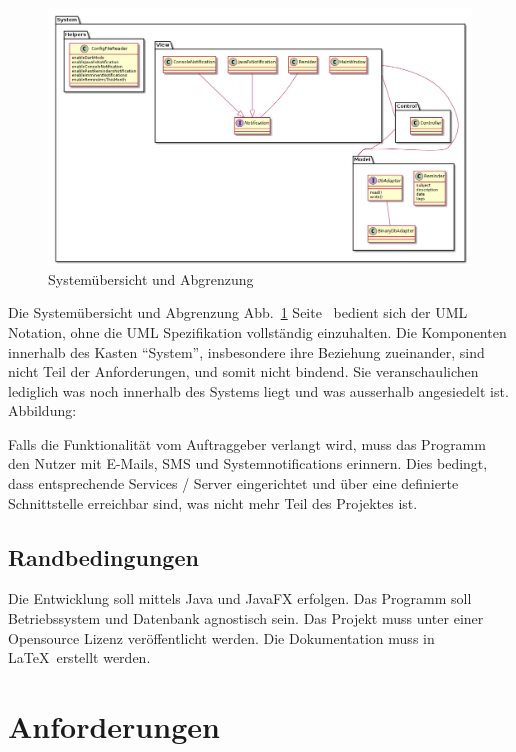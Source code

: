 \documentclass[11pt,titelpage]{scrartcl}
\begin{document}
\begin{landscape}
\begin{figure}
  \centering
    \includegraphics[width=1\textwidth]{../uml/uebersicht.png}
  \caption{Systemübersicht und Abgrenzung}
  \label{fig:overview}
\end{figure}
\end{landscape}
Die Systemübersicht und Abgrenzung Abb.~\ref{fig:overview} Seite~\pageref{fig:overview} bedient sich der UML Notation,
ohne die UML Spezifikation vollständig einzuhalten. Die Komponenten innerhalb des Kasten ``System'', insbesondere ihre
Beziehung zueinander, sind nicht Teil der Anforderungen, und somit nicht bindend. Sie veranschaulichen lediglich was
noch innerhalb des Systems liegt und was ausserhalb
angesiedelt ist.
Abbildung:\pageref{fig:overview}




Falls die Funktionalität vom Auftraggeber verlangt wird, muss das Programm den Nutzer mit E-Mails, SMS und
Systemnotifications erinnern. Dies bedingt, dass entsprechende Services / Server eingerichtet und über eine definierte
Schnittstelle erreichbar sind, was nicht mehr Teil des Projektes ist.

\subsection{Randbedingungen}
Die Entwicklung soll mittels Java und JavaFX erfolgen.
Das Programm soll Betriebssystem und Datenbank agnostisch sein. Das Projekt muss unter einer Opensource Lizenz
veröffentlicht werden.
Die Dokumentation muss in \LaTeX ~erstellt werden.


\section{Anforderungen}
\end{document}
